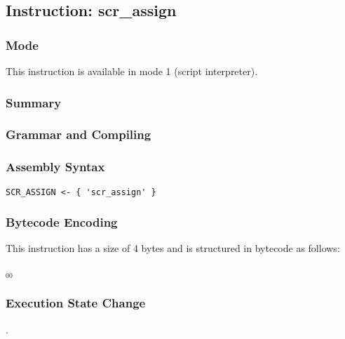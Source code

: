 \subsection{Instruction: scr\_assign}

\subsubsection{Mode}
This instruction is available in mode 1 (script interpreter).
\subsubsection{Summary}


\subsubsection{Grammar and Compiling}


\subsubsection{Assembly Syntax}

\begin{myquote}
\begin{verbatim}
SCR_ASSIGN <- { 'scr_assign' }
\end{verbatim}
\end{myquote}

\subsubsection{Bytecode Encoding}

This instruction has a size of 4 bytes and is structured in bytecode as follows:

$_{00}$\ 


\subsubsection{Execution State Change}

.


